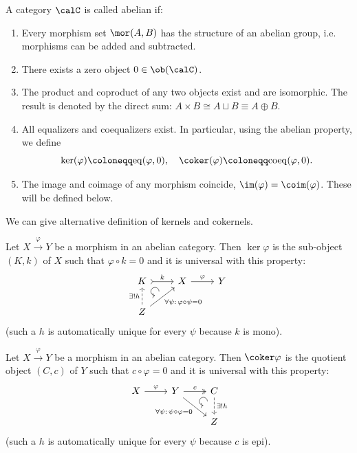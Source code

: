 \begin{defn}
    A category $\calC$ is called abelian if:
    \begin{enumerate}
        \item Every morphism set $\mor(A,B)$ has the structure of an abelian group, i.e. morphisms can be added and subtracted.
        \item There exists a zero object $0\in\ob(\calC)$.
        \item The product and coproduct of any two objects exist and are isomorphic. The result is denoted by the direct sum: $A\times B\cong A\sqcup B \equiv A\oplus B$.
        \item All equalizers and coequalizers exist. In particular, using the abelian property, we define
        \[\ker (\varphi)\coloneqq\mathrm{eq}(\varphi,0),\quad \coker(\varphi)\coloneqq\mathrm{coeq}(\varphi,0).\]
        \item The image and coimage of any morphism coincide, $\im (\varphi)=\coim(\varphi)$. These will be defined below.
    \end{enumerate}
\end{defn}

We can give alternative definition of kernels and cokernels.
\begin{defn}[Kernel]
    Let $X\overset\varphi\to Y$ be a morphism in an abelian category. Then $\ker\varphi$ is the sub-object $(K,k)$ of $X$ such that $\varphi\circ k=0$ and it is universal with this property:
    \[\begin{tikzcd}[every matrix/.append style={name=m},   
        execute at end picture={\draw [<-] ([xshift=-10mm,yshift=-8mm]m-1-2.north) arc[start angle=-90,delta angle=-270,radius=0.15cm];}]
        K \arrow[r,tail,"k"]& X\arrow[r,"\varphi"] & Y\\
        Z\arrow[u,dashed,"\exists! h"]\arrow[ur,swap,"\forall\psi:\,\varphi\circ\psi=0"]& & 
    \end{tikzcd}\]
    (such a $h$ is automatically unique for every $\psi$ because $k$ is mono).
\end{defn}

\begin{defn}[Cokernel]
    Let $X\overset\varphi\to Y$ be a morphism in an abelian category. Then $\coker\varphi$ is the quotient object $(C,c)$ of $Y$ such that $c\circ\varphi=0$ and it is universal with this property:
    \[\begin{tikzcd}[every matrix/.append style={name=m},   
        execute at end picture={\draw [<-] ([xshift=-4mm,yshift=-8mm]m-1-3.north) arc[start angle=-90,delta angle=-270,radius=0.15cm];}]
        X\arrow[r,"\varphi"] & Y \arrow[r,two heads,"c"]\arrow[dr,swap,"\forall\psi:\,\psi\circ\varphi=0"]  & C\arrow[d,dashed,"\exists! h"] \\
        & & Z
    \end{tikzcd}\]
    (such a $h$ is automatically unique for every $\psi$ because $c$ is epi).
\end{defn}

